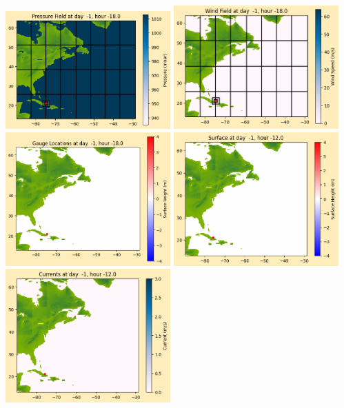 \documentclass[11pt]{article}
\begin{document}
\includegraphics[width=0.475\textwidth]{frame0005fig1012.png}
\vskip 10pt 
\includegraphics[width=0.475\textwidth]{frame0005fig1013.png}
\includegraphics[width=0.475\textwidth]{frame0005fig1014.png}
\vskip 10pt 
\includegraphics[width=0.475\textwidth]{frame0006fig1001.png}
\includegraphics[width=0.475\textwidth]{frame0006fig1002.png}
\end{document}
